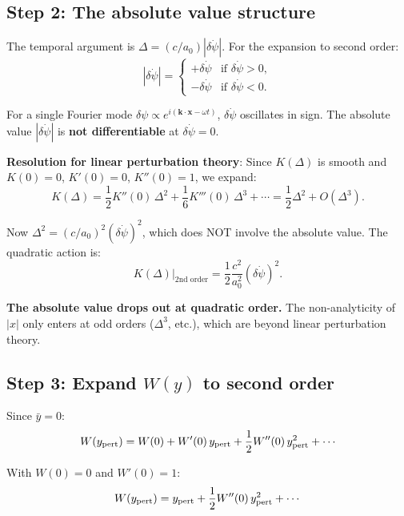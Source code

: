 \documentclass[aps,prd,twocolumn,nofootinbib]{revtex4-2}
\newcommand{\aM}{a_0}
\newcommand{\dpsi}{\delta\psi}
\begin{document}
\subsection{Step 2: The absolute value structure}

The temporal argument is $\Delta = (c/\aM)|\delta\dot\psi|$.
For the expansion to second order:
\begin{equation}
|\delta\dot\psi| = \begin{cases}
+\delta\dot\psi & \text{if } \delta\dot\psi > 0,\\
-\delta\dot\psi & \text{if } \delta\dot\psi < 0.
\end{cases}
\label{eq:abs-value}
\end{equation}

For a single Fourier mode $\dpsi \propto e^{i(\mathbf{k}\cdot\mathbf{x}
- \omega t)}$, $\delta\dot\psi$ oscillates in sign. The absolute value
$|\delta\dot\psi|$ is \textbf{not differentiable} at $\delta\dot\psi = 0$.

\textbf{Resolution for linear perturbation theory}: Since $K(\Delta)$
is smooth and $K(0) = 0$, $K'(0) = 0$, $K''(0) = 1$, we expand:
\begin{equation}
K(\Delta) = \frac{1}{2}K''(0)\,\Delta^2 + \frac{1}{6}K'''(0)\,\Delta^3 + \cdots
= \frac{1}{2}\Delta^2 + O(\Delta^3).
\label{eq:K-expand}
\end{equation}

Now $\Delta^2 = (c/\aM)^2(\delta\dot\psi)^2$, which does NOT involve
the absolute value. The quadratic action is:
\begin{equation}
K(\Delta) \big|_{\text{2nd order}} = \frac{1}{2}\frac{c^2}{\aM^2}(\delta\dot\psi)^2.
\label{eq:K-quadratic}
\end{equation}

\textbf{The absolute value drops out at quadratic order.}
The non-analyticity of $|x|$ only enters at odd orders ($\Delta^3$, etc.),
which are beyond linear perturbation theory.

\subsection{Step 3: Expand $W(y)$ to second order}

Since $\bar{y} = 0$:
\begin{equation}
W(y_{\rm pert}) = W(0) + W'(0)\,y_{\rm pert}
+ \frac{1}{2}W''(0)\,y_{\rm pert}^2 + \cdots
\label{eq:W-expand}
\end{equation}

With $W(0) = 0$ and $W'(0) = 1$:
\begin{equation}
W(y_{\rm pert}) = y_{\rm pert} + \frac{1}{2}W''(0)\,y_{\rm pert}^2 + \cdots
\end{equation}
\end{document}
